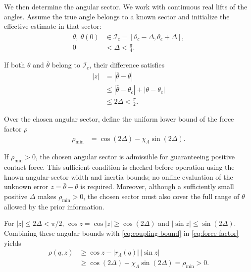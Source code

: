 \documentclass[10pt,journal,letterpaper]{IEEEtran}
\begin{document}
We then determine the angular sector. We work with continuous real lifts of the angles. Assume the true angle belongs to a known sector and initialize the effective estimate in that sector:
\begin{equation}\label{eq:angular-sector}
\begin{aligned}
\theta,\ \bar\theta(0)&\in\mathcal I_c
=[\theta_c-\Delta,\theta_c+\Delta],\\
0&<\Delta<\frac{\pi}{4}.
\end{aligned}
\end{equation}

If both $\theta$ and $\bar\theta$ belong to $\mathcal I_c$, their difference satisfies
\begin{equation}\label{eq:angle-error-bound}
\begin{aligned}
|z|&=|\bar\theta-\theta|\\
&\leq|\bar\theta-\theta_c|+|\theta-\theta_c|\\
&\leq2\Delta<\frac{\pi}{2}.
\end{aligned}
\end{equation}

Over the chosen angular sector, define the uniform lower bound of the force factor $\rho$ 
\begin{equation}\label{eq:force-factor-margin}
\begin{aligned}
\rho_{\min}&=\cos(2\Delta)-\chi_\Lambda\sin(2\Delta).
\end{aligned}
\end{equation}

If $\rho_{\min}>0$, the chosen angular sector is admissible for guaranteeing positive contact force. This sufficient condition is checked before operation using the known angular-sector width and inertia bounds; no online evaluation of the unknown error $z=\bar\theta-\theta$ is required. Moreover, although a sufficiently small positive $\Delta$ makes $\rho_{\min}>0$, the chosen sector must also cover the full range of $\theta$ allowed by the prior information. 

For $|z|\leq2\Delta<\pi/2$, $\cos z=\cos|z|\geq\cos(2\Delta)$ and $|\sin z|\leq\sin(2\Delta)$. Combining these angular bounds with \eqref{eq:coupling-bound} in \eqref{eq:force-factor} yields
\begin{equation}\label{eq:force-factor-bound}
\begin{aligned}
\rho(q,z)
&\geq\cos z-|r_\Lambda(q)|\,|\sin z|\\
&\geq\cos(2\Delta)-\chi_\Lambda\sin(2\Delta)
=\rho_{\min}>0.
\end{aligned}
\end{equation}
\end{document}
